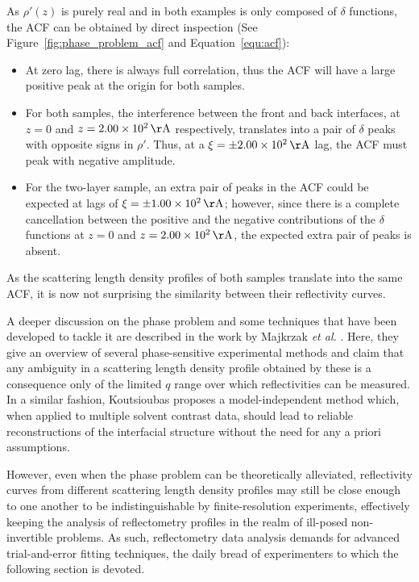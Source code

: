 \documentclass[
 reprint,
 superscriptaddress,
 amsmath,amssymb,
 aps,
]{revtex4-1}
\newcommand{\angstrom}{\rm{\AA}}
\begin{document}
As $\rho'(z)$ is purely real and in both examples is only composed of $\delta$ functions, the ACF can be obtained by direct inspection (See Figure~\ref{fig:phase_problem_acf} and Equation~\ref{equ:acf}):
\begin{itemize}
    \item At zero lag, there is always full correlation, thus the ACF will have a large positive peak at the origin for both samples.
    \item For both samples, the interference between the front and back interfaces, at $z = 0$ and $z = \SI{200}{\angstrom}$ respectively, translates into a pair of $\delta$ peaks with opposite signs in $\rho'$. Thus, at a $\xi = \pm \SI{200}{\angstrom}$ lag, the ACF must peak with negative amplitude.
    \item For the two-layer sample, an extra pair of peaks in the ACF could be expected at lags of $\xi = \pm \SI{100}{\angstrom}$; however, since there is a complete cancellation between the positive and the negative contributions of the $\delta$ functions at $z = 0$ and $z = \SI{200}{\angstrom}$, the expected extra pair of peaks is absent.
\end{itemize}
As the scattering length density profiles of both samples translate into the same ACF, it is now not surprising the similarity between their reflectivity curves.

A deeper discussion on the phase problem and some techniques that have been developed to tackle it are described in the work by Majkrzak \emph{et al.} \cite{majkrzak_phase_2003}. Here, they give an overview of several phase-sensitive experimental methods and claim that any ambiguity in a scattering length density profile obtained by these is a consequence only of the limited $q$ range over which reflectivities can be measured.
In a similar fashion, Koutsioubas \cite{koutsioubas_model_2019} proposes a model-independent method which, when applied to multiple solvent contrast data, should lead to reliable reconstructions of the interfacial structure without the need for any a priori assumptions.

However, even when the phase problem can be theoretically alleviated, reflectivity curves from different scattering length density profiles may still be close enough to one another to be indistinguishable by finite-resolution experiments, effectively keeping the analysis of reflectometry profiles in the realm of ill-posed non-invertible problems.
As such, reflectometry data analysis demands for advanced trial-and-error fitting techniques, the daily bread of experimenters to which the following section is devoted.
\end{document}
